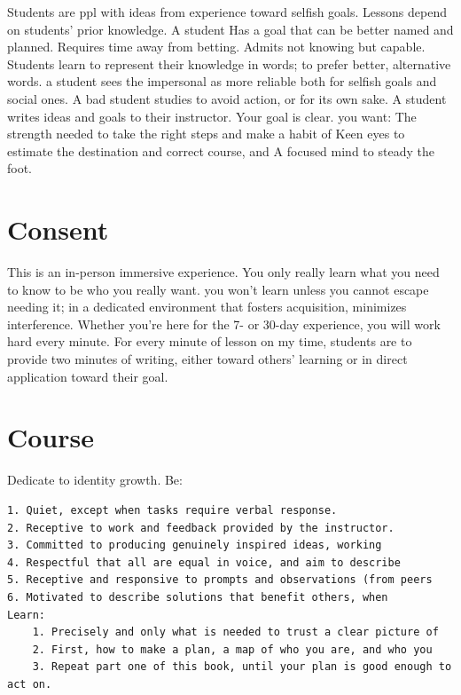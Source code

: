 \documentclass[
]{book}
\begin{document}
Students are ppl with ideas from experience toward selfish goals.
Lessons depend on students' prior knowledge.
A student
Has a goal that can be better named and planned.
Requires time away from betting.
Admits not knowing but capable.
Students learn to represent their knowledge in words; to prefer better, alternative words. a student sees the impersonal as more reliable both for selfish goals and social ones.
A bad student studies to avoid action, or for its own sake.
A student writes ideas and goals to their instructor.
Your goal is clear. you want:
The strength needed to take the right steps and make a habit of
Keen eyes to estimate the destination and correct course, and
A focused mind to steady the foot.

\hypertarget{consent}{%
\section{Consent}\label{consent}}

This is an in-person immersive experience.
You only really learn what you need to know to be who you really want. you won't learn unless you cannot escape needing it; in a dedicated environment that fosters acquisition, minimizes interference.
Whether you're here for the 7- or 30-day experience, you will work hard every minute.
For every minute of lesson on my time, students are to provide two minutes of writing, either toward others' learning or in direct application toward their goal.

\hypertarget{course}{%
\section{Course}\label{course}}

Dedicate to identity growth. Be:

\begin{verbatim}
1. Quiet, except when tasks require verbal response.
2. Receptive to work and feedback provided by the instructor.
3. Committed to producing genuinely inspired ideas, working
4. Respectful that all are equal in voice, and aim to describe
5. Receptive and responsive to prompts and observations (from peers
6. Motivated to describe solutions that benefit others, when
Learn:  
    1. Precisely and only what is needed to trust a clear picture of  
    2. First, how to make a plan, a map of who you are, and who you  
    3. Repeat part one of this book, until your plan is good enough to act on. 
\end{verbatim}
\end{document}
